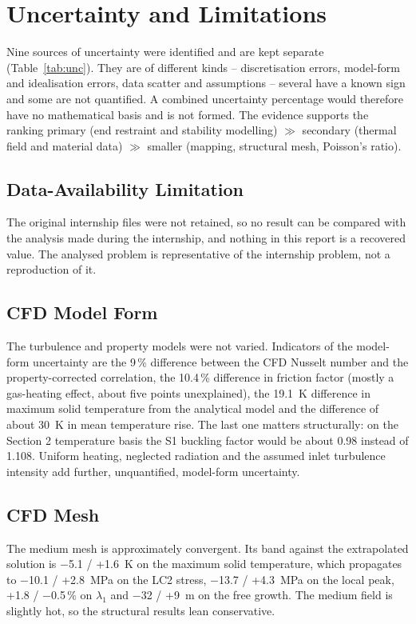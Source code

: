 \chapter{Uncertainty and Limitations}\label{ch:unc}
Nine sources of uncertainty were identified and are kept separate (Table~\ref{tab:unc}). They are of different kinds -- discretisation
errors, model-form and idealisation errors, data scatter and assumptions -- several have a known sign and some are not quantified. A combined
uncertainty percentage would therefore have no mathematical basis and is not formed. The evidence supports the ranking primary (end restraint
and stability modelling) $\gg$ secondary (thermal field and material data) $\gg$ smaller (mapping, structural mesh, Poisson's ratio).



\section{Data-Availability Limitation}
The original internship files were not retained, so no result can be compared with the analysis made during the internship, and nothing
in this report is a recovered value. The analysed problem is representative of the internship problem, not a reproduction of it.

\section{CFD Model Form}
The turbulence and property models were not varied. Indicators of the model-form uncertainty are the 9\,\% difference between the CFD Nusselt
number and the property-corrected correlation, the 10.4\,\% difference in friction factor (mostly a gas-heating effect, about five points
unexplained), the 19.1~K difference in maximum solid temperature from the analytical model and the difference of about 30~K in mean
temperature rise. The last one matters structurally: on the Section 2 temperature basis the S1 buckling factor would be about 0.98 instead of
1.108. Uniform heating, neglected radiation and the assumed inlet turbulence intensity add further, unquantified, model-form uncertainty.

\section{CFD Mesh}
The medium mesh is approximately convergent. Its band against the extrapolated solution is $-$5.1 / +1.6~K on the maximum solid temperature, which
propagates to $-$10.1 / +2.8~MPa on the LC2 stress, $-$13.7 / +4.3~MPa on the local peak, +1.8 / $-$0.5\,\% on $\lambda_1$ and $-$32 / +9~\textmu m on
the free growth. The medium field is slightly hot, so the structural results lean conservative.

